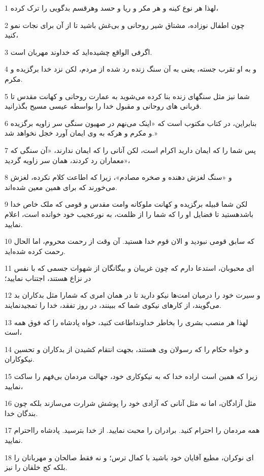 \par 1 لهذا هر نوع کینه و هر مکر و ریا و حسد وهرقسم بدگویی را ترک کرده،
\par 2 چون اطفال نوزاده، مشتاق شیر روحانی و بی‌غش باشید تا از آن برای نجات نمو کنید،
\par 3 اگرفی الواقع چشیده‌اید که خداوند مهربان است.
\par 4 و به او تقرب جسته، یعنی به آن سنگ زنده رد شده از مردم، لکن نزد خدا برگزیده و مکرم.
\par 5 شما نیز مثل سنگهای زنده بنا کرده می‌شوید به عمارت روحانی و کهانت مقدس تا قربانی های روحانی و مقبول خدا را بواسطه عیسی مسیح بگذرانید.
\par 6 بنابراین، در کتاب مکتوب است که «اینک می‌نهم در صهیون سنگی سر زاویه برگزیده و مکرم و هر‌که به وی ایمان آورد خجل نخواهد شد.»
\par 7 پس شما را که ایمان دارید اکرام است، لکن آنانی را که ایمان ندارند، «آن سنگی که معماران رد کردند، همان سر زاویه گردید»،
\par 8 و «سنگ لغزش دهنده و صخره مصادم»، زیرا که اطاعت کلام نکرده، لغزش می‌خورند که برای همین معین شده‌اند.
\par 9 لکن شما قبیله برگزیده و کهانت ملوکانه وامت مقدس و قومی که ملک خاص خدا باشدهستید تا فضایل او را که شما را از ظلمت، به نورعجیب خود خوانده است، اعلام نمایید.
\par 10 که سابق قومی نبودید و الان قوم خدا هستید. آن وقت از رحمت محروم، اما الحال رحمت کرده شده‌اید.
\par 11 ‌ای محبوبان، استدعا دارم که چون غریبان و بیگانگان از شهوات جسمی که با نفس در نزاع هستند، اجتناب نمایید؛
\par 12 و سیرت خود را درمیان امت‌ها نیکو دارید تا در همان امری که شمارا مثل بدکاران بد می‌گویند، از کارهای نیکوی شما که ببینند، در روز تفقد، خدا را تمجیدنمایند.
\par 13 لهذا هر منصب بشری را بخاطر خداونداطاعت کنید، خواه پادشاه را که فوق همه است،
\par 14 و خواه حکام را که رسولان وی هستند، بجهت انتقام کشیدن از بدکاران و تحسین نیکوکاران.
\par 15 زیرا که همین است اراده خدا که به نیکوکاری خود، جهالت مردمان بی‌فهم را ساکت نمایید،
\par 16 مثل آزادگان، اما نه مثل آنانی که آزادی خود را پوشش شرارت می‌سازند بلکه چون بندگان خدا.
\par 17 همه مردمان را احترام کنید. برادران را محبت نمایید. از خدا بترسید. پادشاه رااحترام نمایید.
\par 18 ‌ای نوکران، مطیع آقایان خود باشید با کمال ترس؛ و نه فقط صالحان و مهربانان را بلکه کج خلقان را نیز.
